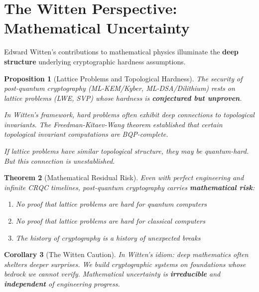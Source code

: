 \documentclass[11pt,a4paper]{article}
\newtheorem{theorem}{Theorem}[section]
\newtheorem{proposition}[theorem]{Proposition}
\newtheorem{corollary}[theorem]{Corollary}
\begin{document}
\section{The Witten Perspective: Mathematical Uncertainty}

Edward Witten's contributions to mathematical physics illuminate the \textbf{deep structure} underlying cryptographic hardness assumptions.

\begin{proposition}[Lattice Problems and Topological Hardness]
The security of post-quantum cryptography (ML-KEM/Kyber, ML-DSA/Dilithium) rests on lattice problems (LWE, SVP) whose hardness is \textbf{conjectured but unproven}.

In Witten's framework, hard problems often exhibit deep connections to topological invariants. The Freedman-Kitaev-Wang theorem established that certain topological invariant computations are BQP-complete.

If lattice problems have similar topological structure, they may be quantum-hard. But this connection is unestablished.
\end{proposition}

\begin{theorem}[Mathematical Residual Risk]
Even with perfect engineering and infinite CRQC timelines, post-quantum cryptography carries \textbf{mathematical risk}:
\begin{enumerate}[noitemsep]
    \item No proof that lattice problems are hard for quantum computers
    \item No proof that lattice problems are hard for classical computers
    \item The history of cryptography is a history of unexpected breaks
\end{enumerate}
\end{theorem}

\begin{corollary}[The Witten Caution]
In Witten's idiom: deep mathematics often shelters deeper surprises. We build cryptographic systems on foundations whose bedrock we cannot verify. Mathematical uncertainty is \textbf{irreducible} and \textbf{independent} of engineering progress.
\end{corollary}

\end{document}
